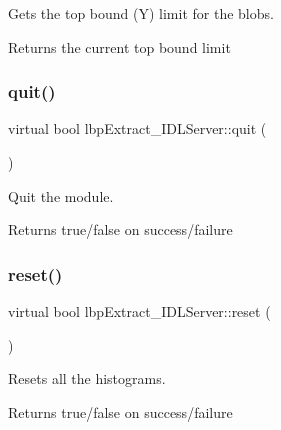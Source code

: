 Gets the top bound (Y) limit for the blobs. 

\begin{DoxyReturn}{Returns}
the current top bound limit 
\end{DoxyReturn}
\mbox{\label{classlbpExtract__IDLServer_a4086feb2a3cee548670673235277b6f0}} 
\subsubsection{\texorpdfstring{quit()}{quit()}}
{\footnotesize\ttfamily virtual bool lbp\+Extract\+\_\+\+I\+D\+L\+Server\+::quit (\begin{DoxyParamCaption}{ }\end{DoxyParamCaption})\hspace{0.3cm}{\ttfamily [virtual]}}



Quit the module. 

\begin{DoxyReturn}{Returns}
true/false on success/failure 
\end{DoxyReturn}
\mbox{\label{classlbpExtract__IDLServer_a9d9b1223c68851e94b0c8c0bd8d3cedc}} 
\subsubsection{\texorpdfstring{reset()}{reset()}}
{\footnotesize\ttfamily virtual bool lbp\+Extract\+\_\+\+I\+D\+L\+Server\+::reset (\begin{DoxyParamCaption}{ }\end{DoxyParamCaption})\hspace{0.3cm}{\ttfamily [virtual]}}



Resets all the histograms. 

\begin{DoxyReturn}{Returns}
true/false on success/failure 
\end{DoxyReturn}
\mbox{\label{classlbpExtract__IDLServer_a88f2492af4a66eaf9be8ceb28c862fe5}} 
